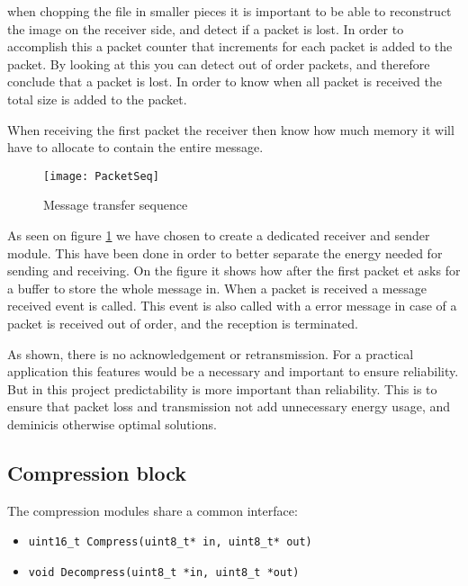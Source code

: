 when chopping the file in smaller pieces it is important to be able to reconstruct the image on the receiver side, and detect if a packet is lost. 
In order to accomplish this a packet counter that increments for each packet is added to the packet. 
By looking at this you can detect out of order packets, and therefore conclude that a packet is lost. 
In order to know when all packet is received the total size is added to the packet.  

When receiving the first packet the receiver then know how much memory it will have to allocate to contain the entire message. 


\begin{figure}[H]
	\centering
	\texttt{[image: PacketSeq]}
	\caption{Message transfer sequence }
	\label{fig:PacketSeq}
\end{figure}

As seen on figure \ref{fig:PacketSeq} we have chosen to create a dedicated receiver and sender module. 
This have been done in order to better separate the energy needed for sending and receiving. 
On the figure it shows how after the first packet et asks for a buffer to store the whole message in. 
When a packet is received a message received event is called. 
This event is also called with a error message in case of a packet is received out of order, and the reception is terminated. 

As shown, there is no acknowledgement or retransmission. 
For a practical application this features would be a necessary and important to ensure reliability. 
But in this project predictability is more important than reliability.  
This is to ensure that packet loss and transmission not add unnecessary energy usage, and deminicis otherwise optimal solutions.  




\subsection{Compression block}
\label{sec:Compression-block}

The compression modules share a common interface: 

\begin{itemize}
    \item \texttt{uint16\_t Compress(uint8\_t* in, uint8\_t* out)}
    \item \texttt{void Decompress(uint8\_t *in, uint8\_t *out)}
\end{itemize}

